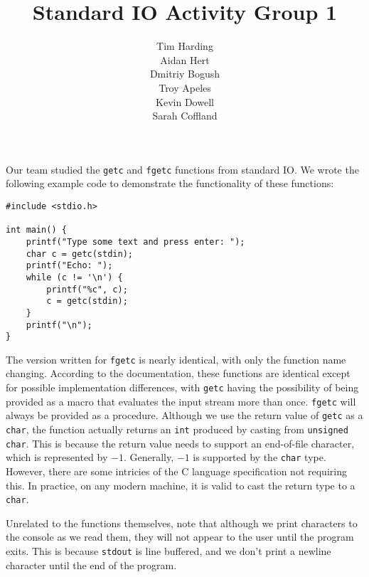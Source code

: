 \documentclass[12pt]{article}
\title{Standard IO Activity Group 1}
\author{Tim Harding\\Aidan Hert\\Dmitriy Bogush\\Troy Apeles\\Kevin Dowell\\Sarah Coffland}
\begin{document}
\maketitle

Our team studied the \texttt{getc} and \texttt{fgetc} functions from standard IO. We wrote the following example code to demonstrate the functionality of these functions:

\begin{verbatim}
#include <stdio.h>

int main() {
    printf("Type some text and press enter: ");
    char c = getc(stdin);
    printf("Echo: ");
    while (c != '\n') {
        printf("%c", c);
        c = getc(stdin);
    }
    printf("\n");
}
\end{verbatim}

The version written for \texttt{fgetc} is nearly identical, with only the function name changing. According to the documentation, these functions are identical except for possible implementation differences, with \texttt{getc} having the possibility of being provided as a macro that evaluates the input stream more than once. \texttt{fgetc} will always be provided as a procedure. Although we use the return value of \texttt{getc} as a \texttt{char}, the function actually returns an \texttt{int} produced by casting from \texttt{unsigned char}. This is because the return value needs to support an end-of-file character, which is represented by $-1$. Generally, $-1$ is supported by the \texttt{char} type. However, there are some intricies of the C language specification not requiring this. In practice, on any modern machine, it is valid to cast the return type to a \texttt{char}.

Unrelated to the functions themselves, note that although we print characters to the console as we read them, they will not appear to the user until the program exits. This is because \texttt{stdout} is line buffered, and we don't print a newline character until the end of the program.
\end{document}
